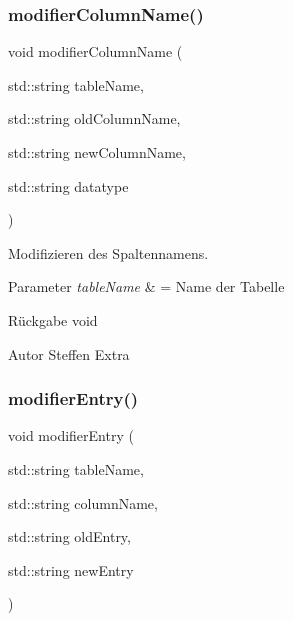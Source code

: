 \mbox{\label{sqllib_8hpp_a244b10b3b373f8a174943176101a480f}} 
\subsubsection{modifier\+Column\+Name()}
{\footnotesize\ttfamily void modifier\+Column\+Name (\begin{DoxyParamCaption}\item[{std\+::string}]{table\+Name,  }\item[{std\+::string}]{old\+Column\+Name,  }\item[{std\+::string}]{new\+Column\+Name,  }\item[{std\+::string}]{datatype }\end{DoxyParamCaption})}



Modifizieren des Spaltennamens. 


\begin{DoxyParams}{Parameter}
{\em table\+Name} & = Name der Tabelle\\
\hline
\end{DoxyParams}
\begin{DoxyReturn}{Rückgabe}
void
\end{DoxyReturn}
\begin{DoxyAuthor}{Autor}
Steffen Extra 
\end{DoxyAuthor}
\mbox{\label{sqllib_8hpp_ab254b5514a4950c7479bc4d513c438dc}} 
\subsubsection{modifier\+Entry()}
{\footnotesize\ttfamily void modifier\+Entry (\begin{DoxyParamCaption}\item[{std\+::string}]{table\+Name,  }\item[{std\+::string}]{column\+Name,  }\item[{std\+::string}]{old\+Entry,  }\item[{std\+::string}]{new\+Entry }\end{DoxyParamCaption})}

\mbox{\label{sqllib_8hpp_a0659d93a42f84756e52155eb333c4fec}} 
